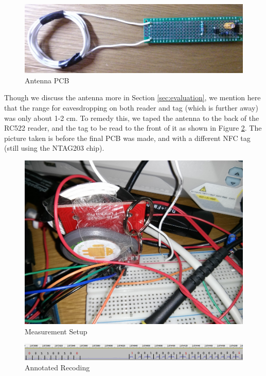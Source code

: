 \documentclass[fleqn,10pt]{SelfArx} %
\begin{document}
\begin{figure}[h]
  \includegraphics[width=\linewidth]{img/antennapic}
  \caption{Antenna PCB}
  \label{fig:antennapic}
\end{figure}


Though we discuss the antenna more in Section \ref{sec:evaluation}, we mention here that the range for eavesdropping on both reader and tag (which is further away) was only about 1-2 cm. To remedy this, we taped the antenna to the back of the RC522 reader, and the tag to be read to the front of it as shown in Figure \ref{fig:setup}. The picture taken is before the final PCB was made, and with a different NFC tag (still using the NTAG203 chip).


\begin{figure}[h]
  \includegraphics[width=\linewidth]{img/setup}
  \caption{Measurement Setup}
  \label{fig:setup}
\end{figure}


\begin{figure}[!t]
  \includegraphics[width=\textwidth]{img/annotated}
  \caption{Annotated Recoding}
  \label{fig:annotated}
\end{figure}
\end{document}
